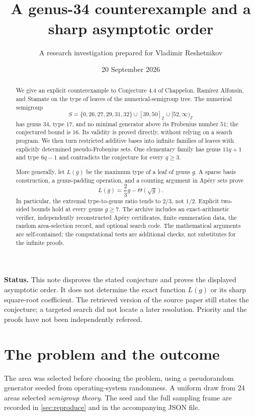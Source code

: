 \documentclass[11pt,letterpaper]{article}
\title{\vspace{-0.7cm}{\LARGE\bfseries Leaves of Large Type in the\\[4pt]
 Numerical-Semigroup Tree}\\[9pt]
 {\large A genus-34 counterexample and a sharp asymptotic order}}
\author{A research investigation prepared for Vladimir Reshetnikov}
\date{20 September 2026}
\numberwithin{equation}{section}
\theoremstyle{definition}
\theoremstyle{remark}
\newcommand{\Z}{\mathbb Z}
\newcommand{\ints}[2]{[#1,#2]_{\Z}}
\newcommand{\tail}[1]{[#1,\infty)_{\Z}}
\begin{document}
\maketitle
\thispagestyle{empty}
\begin{abstract}
We give an explicit counterexample to Conjecture 4.4 of Chappelon, Ram\'irez
Alfons\'in, and Stamate on the type of leaves of the numerical-semigroup tree.
The numerical semigroup
\[
 S=\{0,26,27,29,31,32\}\cup\ints{39}{50}\cup\tail{52}
\]
has genus $34$, type $17$, and no minimal generator above its Frobenius number
$51$; the conjectured bound is $16$. Its validity is proved directly, without
relying on a search program. We then turn restricted additive bases into
infinite families of leaves with explicitly determined pseudo-Frobenius sets.
One elementary family has genus $11q+1$ and type $6q-1$ and contradicts the
conjecture for every $q\ge3$.

More generally, let $L(g)$ be the maximum type of a leaf of genus $g$. A sparse
basis construction, a genus-padding operation, and a counting argument in
Ap\'ery sets prove
\[
 L(g)=\frac23g-\Theta(\sqrt g).
\]
In particular, the extremal type-to-genus ratio tends to $2/3$, not $1/2$.
Explicit two-sided bounds hold at every genus $g\ge7$. The archive includes
an exact-arithmetic verifier, independently reconstructed Ap\'ery certificates,
finite enumeration data, the random area-selection record, and optional search
code. The mathematical arguments are self-contained; the computational tests
are additional checks, not substitutes for the infinite proofs.
\end{abstract}

\vspace{6pt}
\noindent\textbf{Status.} This note disproves the stated conjecture and proves
the displayed asymptotic order. It does not determine the exact function
$L(g)$ or its sharp square-root coefficient. The retrieved version of the
source paper still states the conjecture; a targeted search did not locate a
later resolution. Priority and the proofs have not been independently refereed.

\newpage
\tableofcontents
\newpage

\section{The problem and the outcome}\label{sec:problem}

The area was selected before choosing the problem, using a pseudorandom
generator seeded from operating-system randomness. A uniform draw from 24
areas selected \emph{semigroup theory}. The seed and the full sampling frame
are recorded in \cref{sec:reproduce} and in the accompanying JSON file.
\end{document}

